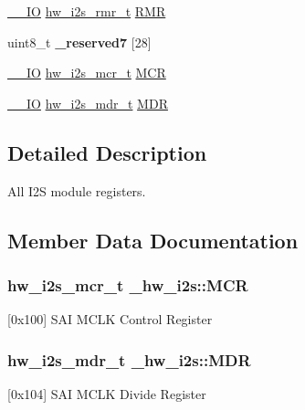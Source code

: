 \begin{DoxyCompactItemize}
\item 
\hyperlink{core__sc300_8h_aec43007d9998a0a0e01faede4133d6be}{\+\_\+\+\_\+\+IO} \hyperlink{union__hw__i2s__rmr}{hw\+\_\+i2s\+\_\+rmr\+\_\+t} \hyperlink{struct__hw__i2s_a9ddcad17780e63698043f15a63eb60f6}{R\+MR}
\item 
uint8\+\_\+t {\bfseries \+\_\+reserved7} \mbox{[}28\mbox{]}\hypertarget{struct__hw__i2s_a41193e333bf90e87432e1e1ffa4e5f59}{}\label{struct__hw__i2s_a41193e333bf90e87432e1e1ffa4e5f59}

\item 
\hyperlink{core__sc300_8h_aec43007d9998a0a0e01faede4133d6be}{\+\_\+\+\_\+\+IO} \hyperlink{union__hw__i2s__mcr}{hw\+\_\+i2s\+\_\+mcr\+\_\+t} \hyperlink{struct__hw__i2s_a49f9aba036282207abdb7cff26750fec}{M\+CR}
\item 
\hyperlink{core__sc300_8h_aec43007d9998a0a0e01faede4133d6be}{\+\_\+\+\_\+\+IO} \hyperlink{union__hw__i2s__mdr}{hw\+\_\+i2s\+\_\+mdr\+\_\+t} \hyperlink{struct__hw__i2s_af964170a4ffcf146505ee4017ef694e3}{M\+DR}
\end{DoxyCompactItemize}


\subsection{Detailed Description}
All I2S module registers. 

\subsection{Member Data Documentation}
\subsubsection[{\texorpdfstring{M\+CR}{MCR}}]{ {\bf hw\+\_\+i2s\+\_\+mcr\+\_\+t} \+\_\+hw\+\_\+i2s\+::\+M\+CR}\hypertarget{struct__hw__i2s_a49f9aba036282207abdb7cff26750fec}{}\label{struct__hw__i2s_a49f9aba036282207abdb7cff26750fec}
\mbox{[}0x100\mbox{]} S\+AI M\+C\+LK Control Register 
\subsubsection[{\texorpdfstring{M\+DR}{MDR}}]{ {\bf hw\+\_\+i2s\+\_\+mdr\+\_\+t} \+\_\+hw\+\_\+i2s\+::\+M\+DR}\hypertarget{struct__hw__i2s_af964170a4ffcf146505ee4017ef694e3}{}\label{struct__hw__i2s_af964170a4ffcf146505ee4017ef694e3}
\mbox{[}0x104\mbox{]} S\+AI M\+C\+LK Divide Register 
